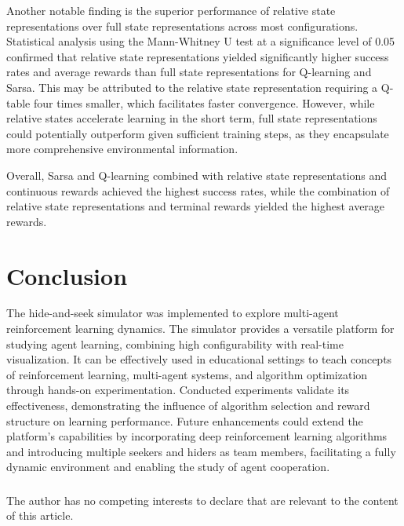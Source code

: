 \documentclass[runningheads]{llncs}
\begin{document}
Another notable finding is the superior performance of relative state representations over full state representations across most configurations. Statistical analysis using the Mann-Whitney U test at a significance level of 0.05 confirmed that relative state representations yielded significantly higher success rates and average rewards than full state representations for Q-learning and Sarsa. This may be attributed to the relative state representation requiring a Q-table four times smaller, which facilitates faster convergence. However, while relative states accelerate learning in the short term, full state representations could potentially outperform given sufficient training steps, as they encapsulate more comprehensive environmental information. 

Overall, Sarsa and Q-learning combined with relative state representations and continuous rewards achieved the highest success rates, while the combination of relative state representations and terminal rewards yielded the highest average rewards.


\section{Conclusion}
The hide-and-seek simulator was implemented to explore multi-agent reinforcement learning dynamics. The simulator provides a versatile platform for studying agent learning, combining high configurability with real-time visualization. It can be effectively used in educational settings to teach concepts of reinforcement learning, multi-agent systems, and algorithm optimization through hands-on experimentation. Conducted experiments validate its effectiveness, demonstrating the influence of algorithm selection and reward structure on learning performance. Future enhancements could extend the platform’s capabilities by incorporating deep reinforcement learning algorithms and introducing multiple seekers and hiders as team members, facilitating a fully dynamic environment and enabling the study of agent cooperation.



















\begin{credits}


\subsubsection{\discintname}
The author has no competing interests to declare that are
relevant to the content of this article.
\end{credits}
\end{document}
